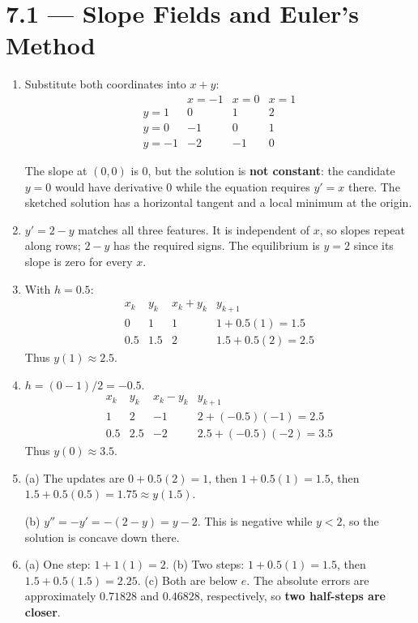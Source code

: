 \documentclass[11pt]{article}
\newcommand{\topic}[2]{\clearpage\section*{#1 --- #2}}
\begin{document}
\topic{7.1}{Slope Fields and Euler's Method}
\begin{enumerate}[itemsep=0.55em]
\item Substitute both coordinates into $x+y$:
\[
\begin{array}{c|rrr}&x=-1&x=0&x=1\\\hline
y=1&0&1&2\\y=0&-1&0&1\\y=-1&-2&-1&0\end{array}
\]
\begin{center}
\end{center}
The slope at $(0,0)$ is $\boxed0$, but the solution is \textbf{not constant}: the candidate $y=0$ would have derivative $0$ while the equation requires $y'=x$ there. The sketched solution has a horizontal tangent and a local minimum at the origin.
\item $\boxed{y'=2-y}$ matches all three features. It is independent of $x$, so slopes repeat along rows; $2-y$ has the required signs. The equilibrium is $\boxed{y=2}$ since its slope is zero for every $x$.
\item With $h=0.5$:
\[
\begin{array}{c|c|c|c}
x_k&y_k&x_k+y_k&y_{k+1}\\\hline
0&1&1&1+0.5(1)=1.5\\
0.5&1.5&2&1.5+0.5(2)=2.5
\end{array}
\]
Thus $\boxed{y(1)\approx2.5}$.
\item $h=(0-1)/2=\boxed{-0.5}$.
\[
\begin{array}{c|c|c|c}
x_k&y_k&x_k-y_k&y_{k+1}\\\hline
1&2&-1&2+(-0.5)(-1)=2.5\\
0.5&2.5&-2&2.5+(-0.5)(-2)=3.5
\end{array}
\]
Thus $\boxed{y(0)\approx3.5}$.
\item (a) The updates are $0+0.5(2)=1$, then $1+0.5(1)=1.5$, then $1.5+0.5(0.5)=\boxed{1.75\approx y(1.5)}$.

(b) $y''=-y'=-(2-y)=\boxed{y-2}$. This is negative while $y<2$, so the solution is concave down there.
\item (a) One step: $1+1(1)=\boxed2$.
(b) Two steps: $1+0.5(1)=1.5$, then $1.5+0.5(1.5)=\boxed{2.25}$.
(c) Both are below $e$. The absolute errors are approximately $0.71828$ and $0.46828$, respectively, so \textbf{two half-steps are closer}.
\end{enumerate}
\end{document}
